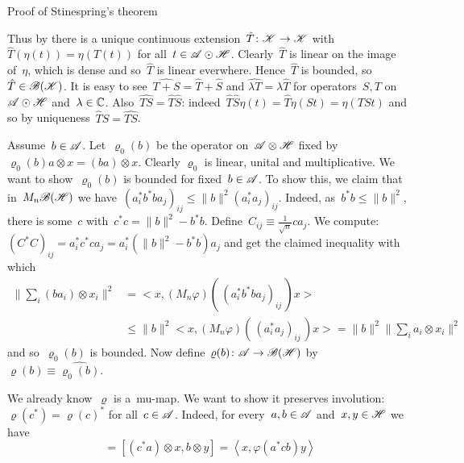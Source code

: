 \documentclass[b]{subfiles}
\begin{document}
\begin{parsec}
\begin{point}
\begin{point}{Proof of Stinespring's theorem }
\begin{point}
Thus by 
there is a unique continuous extension~$\hat{T} \colon \mathscr{K} \to \mathscr{K}$
with~$\hat{T}(\eta(t)) = \eta(T(t))$
    for all~$t \in \mathscr{A}\odot\mathscr{H}$.
Clearly~$\hat{T}$ is linear on the image of~$\eta$,
    which is dense and so~$\hat{T}$ is linear everwhere.
Hence~$\hat{T}$ is bounded, so~$\hat{T} \in \mathscr{B}(\mathscr{K})$.
It is easy to see~$\widehat{T+S}=\hat{T}+\hat{S}$ and
    $\widehat{\lambda T} = \lambda \hat{T}$
    for operators~$S,T$ on~$\mathscr{A} \odot \mathscr{H}$ and~$\lambda \in \mathbb{C}$.
Also~$\widehat{TS} = \hat{T}\hat{S}$:
indeed~$\hat{T}\hat{S} \eta(t)
            = \hat{T} \eta(St)
            = \eta(TSt)$
    and so by uniqueness~$\hat{T}\hat{S} = \widehat{TS}$.
\end{point}
\begin{point}%
    Assume~$b\in \mathscr{A}$.
    Let~$\varrho_0(b)$ be the operator on~$\mathscr{A} \otimes \mathscr{H}$
    fixed by~$\varrho_0(b) a\otimes x = (b a) \otimes x$.
Clearly $\varrho_0$ is linear, unital and multiplicative.
We want to show~$\varrho_0(b)$ is bounded for fixed~$b \in \mathscr{A}$.
To show this, we claim that in~$M_n\mathscr{B}(\mathscr{H})$
we have~$(a_i^*b^*ba_j)_{ij} \leq \|b\|^2 (a_i^*a_j)_{ij}$.
Indeed, as~$b^*b \leq \|b\|^2$,
    there is some~$c$ with~$c^*c = \|b\|^2 - b^*b$.
Define~$C_{ij} \equiv \frac{1}{\sqrt{n}} ca_j$.
We compute:
$ (C^*C)_{ij} = a_i^*c^*ca_j = a_i^* (\|b\|^2 - b^*b) a_j$
and get the claimed inequality with which
\begin{equation*}
    \begin{split}
    \bigl\| \sum_i (ba_i) \otimes x_i \bigr\|^2
    & = \bigl< x, (M_n\varphi)(\, (a_i^* b^*b a_j)_{ij}\,)x\bigr> \\
    &\leq \|b\|^2 \bigl< x, (M_n\varphi)(\, (a_i^* a_j)_{ij}\,)x\bigr>
    = \|b\|^2 \bigl\| \sum_i a_i \otimes x_i \bigr\|^2
    \end{split}
\end{equation*}
and so~$\varrho_0(b)$ is bounded.
Now define~$\varrho(b) \colon \mathscr{A} \to \mathscr{B}(\mathscr{H})$
    by~$\varrho(b) \equiv \widehat{\varrho_0(b)}$.
\end{point}
\begin{point}%
We already know~$\varrho$ is a~mu-map.
We want to show it preserves involution: $\varrho(c^*) = \varrho(c)^*$
for all~$c \in \mathscr{A}$.
Indeed, for every~$a,b \in \mathscr{A}$ and~$x,y \in \mathscr{H}$
    we have
    \begin{equation*}
        [\varrho_0(c^*) \, a\otimes x,b \otimes y]
        = [(c^* a)\otimes x,b \otimes y]
        = \left<x, \varphi(a^*cb) y \right>

\end{equation*}
\end{point}
\end{point}
\end{point}
\end{parsec}
\end{document}
